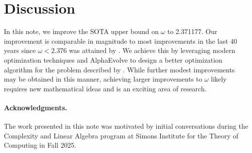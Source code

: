 \documentclass[11pt, a4paper, copyright, gdm]{google}
\newcommand{\method}{{AlphaEvolve}\xspace}
\theoremstyle{definition}
\theoremstyle{remark}
\theoremstyle{plain}
\begin{document}
\section{Discussion}

In this note, we improve the SOTA upper bound on $\omega$ to 2.371177. 
Our improvement is comparable in magnitude to most improvements in the last 40 years since $\omega < 2.376$ was attained by \cite{coppersmith1990matrix}. 
We achieve this by leveraging modern optimization techniques and \method to design a better optimization algorithm for the problem described by \cite{alman2025more}.
While further modest improvements may be obtained in this manner, achieving larger improvements to $\omega$ likely requires new mathematical ideas and is an exciting area of research.

\paragraph{Acknowledgments.} The work presented in this note was motivated by initial conversations during the Complexity and Linear Algebra program at Simons Institute for the Theory of Computing in Fall 2025.

\newpage


\end{document}
